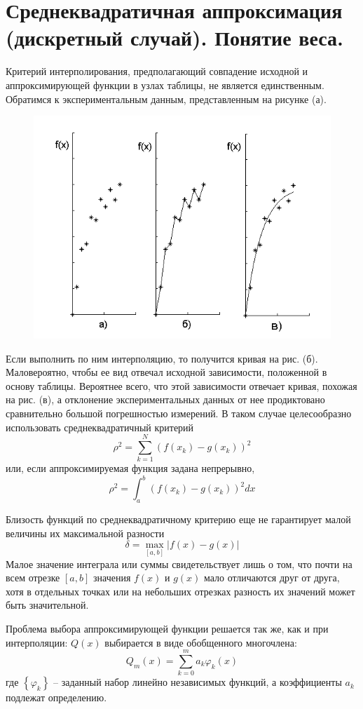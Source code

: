 \section{Среднеквадратичная аппроксимация (дискретный случай). Понятие веса.}\label{sec:ch13}
Критерий интерполирования, предполагающий совпадение исходной и аппроксимирующей функции в узлах таблицы, не является
единственным. Обратимся к экспериментальным данным, представленным на рисунке (а).
\begin{figure}[H]
    \centering
    \includegraphics[width=0.5\linewidth]{subfiles/images/13_1}
\end{figure}
Если выполнить по ним интерполяцию, то получится кривая на рис. (б). Маловероятно, чтобы ее вид отвечал исходной
зависимости, положенной в основу таблицы. Вероятнее всего, что этой зависимости отвечает кривая, похожая на рис. (в),
а отклонение экспериментальных данных от нее продиктовано сравнительно большой погрешностью измерений. В таком случае
целесообразно использовать среднеквадратичный критерий
\begin{equation*}
    \rho^2 = \sum_{k=1}^{N} \left( f(x_k) - g(x_k) \right)^2
\end{equation*}
или, если аппроксимируемая функция задана непрерывно,
\begin{equation*}
    \rho^2 = \int_a^b \left( f(x_k) - g(x_k) \right)^2 dx
\end{equation*}

Близость функций по среднеквадратичному критерию еще не гарантирует малой величины их максимальной разности
\begin{equation*}
    \delta = \max_{[a, b]} \left| f(x) - g(x) \right|
\end{equation*}
Малое значение интеграла или суммы свидетельствует лишь о том, что почти на всем отрезке $[a, b]$ значения $f(x)$ и $g(x)$
мало отличаются друг от друга, хотя в отдельных точках или на небольших отрезках разность их значений может быть
значительной.

Проблема выбора аппроксимирующей функции решается так же, как и при интерполяции: $Q(x)$ выбирается в виде обобщенного
многочлена:
\begin{equation}
    Q_m(x) = \sum_{k=0}^{m} a_k \varphi_k (x) \label{eq:com_polynom}
\end{equation}
где $\left\{ \varphi_k \right\}$ -- заданный набор линейно независимых функций, а коэффициенты $a_k$ подлежат определению.

